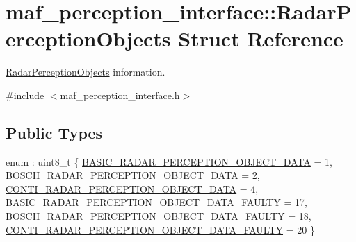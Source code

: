 \hypertarget{structmaf__perception__interface_1_1RadarPerceptionObjects}{}\section{maf\+\_\+perception\+\_\+interface\+:\+:Radar\+Perception\+Objects Struct Reference}
\label{structmaf__perception__interface_1_1RadarPerceptionObjects}


\hyperlink{structmaf__perception__interface_1_1RadarPerceptionObjects}{Radar\+Perception\+Objects} information.  




{\ttfamily \#include $<$maf\+\_\+perception\+\_\+interface.\+h$>$}

\subsection*{Public Types}
\begin{DoxyCompactItemize}
\item 
enum \+: uint8\+\_\+t \{ \newline
\hyperlink{structmaf__perception__interface_1_1RadarPerceptionObjects_a53f7e8d2cfec50ac9a599ebb13ef45fba35ee9fcb102c87b3e96b1db9c4c6da60}{B\+A\+S\+I\+C\+\_\+\+R\+A\+D\+A\+R\+\_\+\+P\+E\+R\+C\+E\+P\+T\+I\+O\+N\+\_\+\+O\+B\+J\+E\+C\+T\+\_\+\+D\+A\+TA} = 1, 
\hyperlink{structmaf__perception__interface_1_1RadarPerceptionObjects_a53f7e8d2cfec50ac9a599ebb13ef45fba9034c8a5de8c46fe8f1c3d81c55e2ddf}{B\+O\+S\+C\+H\+\_\+\+R\+A\+D\+A\+R\+\_\+\+P\+E\+R\+C\+E\+P\+T\+I\+O\+N\+\_\+\+O\+B\+J\+E\+C\+T\+\_\+\+D\+A\+TA} = 2, 
\hyperlink{structmaf__perception__interface_1_1RadarPerceptionObjects_a53f7e8d2cfec50ac9a599ebb13ef45fbabc1775704ea472c36dea162ea35ac61a}{C\+O\+N\+T\+I\+\_\+\+R\+A\+D\+A\+R\+\_\+\+P\+E\+R\+C\+E\+P\+T\+I\+O\+N\+\_\+\+O\+B\+J\+E\+C\+T\+\_\+\+D\+A\+TA} = 4, 
\hyperlink{structmaf__perception__interface_1_1RadarPerceptionObjects_a53f7e8d2cfec50ac9a599ebb13ef45fba0c3d1e6bfb595a627f8b687013eb05dc}{B\+A\+S\+I\+C\+\_\+\+R\+A\+D\+A\+R\+\_\+\+P\+E\+R\+C\+E\+P\+T\+I\+O\+N\+\_\+\+O\+B\+J\+E\+C\+T\+\_\+\+D\+A\+T\+A\+\_\+\+F\+A\+U\+L\+TY} = 17, 
\newline
\hyperlink{structmaf__perception__interface_1_1RadarPerceptionObjects_a53f7e8d2cfec50ac9a599ebb13ef45fba2c9efd2d929b385f744fdc14937b71fb}{B\+O\+S\+C\+H\+\_\+\+R\+A\+D\+A\+R\+\_\+\+P\+E\+R\+C\+E\+P\+T\+I\+O\+N\+\_\+\+O\+B\+J\+E\+C\+T\+\_\+\+D\+A\+T\+A\+\_\+\+F\+A\+U\+L\+TY} = 18, 
\hyperlink{structmaf__perception__interface_1_1RadarPerceptionObjects_a53f7e8d2cfec50ac9a599ebb13ef45fbaaf225e9eee4c0800f7148b5ba1490ae7}{C\+O\+N\+T\+I\+\_\+\+R\+A\+D\+A\+R\+\_\+\+P\+E\+R\+C\+E\+P\+T\+I\+O\+N\+\_\+\+O\+B\+J\+E\+C\+T\+\_\+\+D\+A\+T\+A\+\_\+\+F\+A\+U\+L\+TY} = 20
 \}
\end{DoxyCompactItemize}
